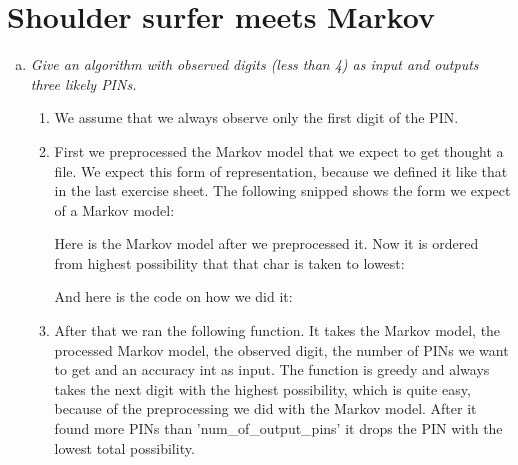 
\graphicspath{ {./src/} } 
\usepackage{hyperref}

\newcommand{\dozent}{Volker Roth}
\newcommand{\tutor}{Oliver Wiese}
\newcommand{\tutoriumNo}{02\\Materialien: Latex, VSC, Skript}
\newcommand{\ubungNo}{05}
\newcommand{\veranstaltung}{Rechnersicherheit}
\newcommand{\semester}{SoSe 21}




\section{Shoulder surfer meets Markov}
\begin{enumerate}[(a)]
    \item {\itshape Give  an  algorithm  with  observed  digits  (less  than  4)  as  input  and  outputs  three likely PINs.}
    \begin{enumerate}[1.]
        \item We assume that we always observe only the first digit of the PIN.
        \item First we preprocessed the Markov model that we expect to get thought a file. We expect this form of representation, because we defined it like that in the last exercise sheet. The following snipped shows the form we expect of a Markov model:
        
        Here is the Markov model after we preprocessed it. Now it is ordered from highest possibility that that char is taken to lowest:
        
        And here is the code on how we did it:
        
        

\newpage
        \item After that we ran the following function. It takes the Markov model, the processed Markov model, the observed digit, the number of PINs we want to get and an accuracy int as input. The function is greedy and always takes the next digit with the highest possibility, which is quite easy, because of the preprocessing we did with the Markov model. After it found more PINs than 'num\_of\_output\_pins' it drops the PIN with the lowest total possibility. 
        


\end{enumerate}
\end{enumerate}
